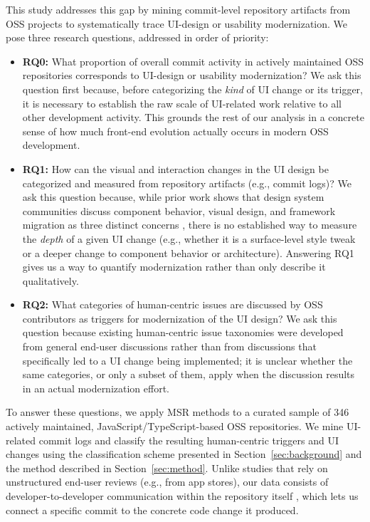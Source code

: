 \documentclass{article}
\begin{document}
This study addresses this gap by mining commit-level repository artifacts
from OSS projects to systematically trace UI-design or usability
modernization. We pose three research questions, addressed in order of
priority:

\begin{itemize}
    \item \textbf{RQ0:} What proportion of overall commit activity in
    actively maintained OSS repositories corresponds to UI-design or
    usability modernization? We ask this question first because, before
    categorizing the \emph{kind} of UI change or its trigger, it is
    necessary to establish the raw scale of UI-related work relative to
    all other development activity. This grounds the rest of our analysis
    in a concrete sense of how much front-end evolution actually occurs in
    modern OSS development.
    \item \textbf{RQ1:} How can the visual and interaction changes in the
    UI design be categorized and measured from repository artifacts (e.g.,
    commit logs)? We ask this question because, while prior work shows
    that design system communities discuss component behavior, visual
    design, and framework migration as three distinct concerns
    \cite{lamine2022understanding}, there is no established way to measure
    the \emph{depth} of a given UI change (e.g., whether it is a
    surface-level style tweak or a deeper change to component behavior or
    architecture). Answering RQ1 gives us a way to quantify modernization
    rather than only describe it qualitatively.
    \item \textbf{RQ2:} What categories of human-centric issues are
    discussed by OSS contributors as triggers for modernization of the UI
    design? We ask this question because existing human-centric issue
    taxonomies \cite{khalajzadeh2022how} were developed from general
    end-user discussions rather than from discussions that specifically
    led to a UI change being implemented; it is unclear whether the same
    categories, or only a subset of them, apply when the discussion
    results in an actual modernization effort.
\end{itemize}

To answer these questions, we apply MSR methods to a curated sample of
346 actively maintained, JavaScript/TypeScript-based OSS repositories.
We mine UI-related commit logs and classify the resulting human-centric
triggers and UI changes using the classification scheme presented in
Section~\ref{sec:background} and the method described in
Section~\ref{sec:method}. Unlike studies that rely on unstructured
end-user reviews (e.g., from app stores), our data consists of
developer-to-developer communication within the repository itself
\cite{lamine2022understanding, cheng2018how}, which lets us connect a
specific commit to the concrete code change it produced.
\end{document}
